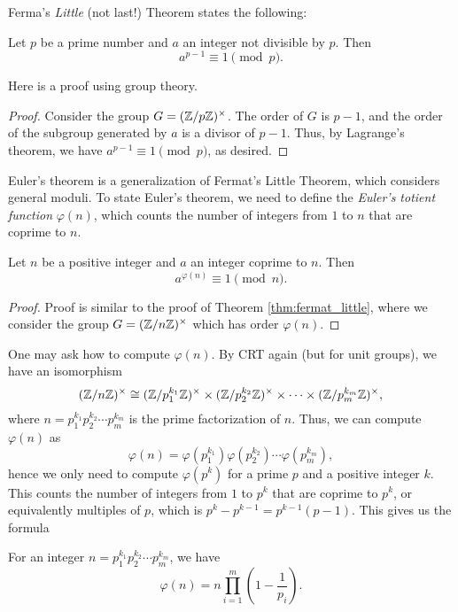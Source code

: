 Ferma's \emph{Little} (not last!) Theorem states the following:
\begin{theorem}
    \label{thm:fermat_little}
    Let $p$ be a prime number and $a$ an integer not divisible by $p$.
    Then
    \[
        a^{p - 1} \equiv 1 \pmod{p}.
    \]
\end{theorem}

Here is a proof using group theory.

\begin{proof}
    Consider the group $G = (\mathbb{Z} / p\mathbb{Z})^\times$.
    The order of $G$ is $p - 1$, and the order of the subgroup generated by $a$ is a divisor of $p - 1$.
    Thus, by Lagrange's theorem, we have $a^{p - 1} \equiv 1 \pmod{p}$, as desired.
\end{proof}

Euler's theorem is a generalization of Fermat's Little Theorem, which considers general moduli.
To state Euler's theorem, we need to define the \emph{Euler's totient function} $\varphi(n)$, which counts the number of integers from $1$ to $n$ that are coprime to $n$.

\begin{theorem}
    \label{thm:euler}
    Let $n$ be a positive integer and $a$ an integer coprime to $n$.
    Then
    \[
        a^{\varphi(n)} \equiv 1 \pmod{n}.
    \]
\end{theorem}
\begin{proof}
    Proof is similar to the proof of Theorem \ref{thm:fermat_little}, where we consider the group $G = (\mathbb{Z} / n\mathbb{Z})^\times$ which has order $\varphi(n)$.
\end{proof}

One may ask how to compute $\varphi(n)$.
By CRT again (but for unit groups), we have an isomorphism
\[
    (\mathbb{Z} / n\mathbb{Z})^\times \cong (\mathbb{Z} / p_1^{k_1}\mathbb{Z})^\times \times (\mathbb{Z} / p_2^{k_2}\mathbb{Z})^\times \times \cdots \times (\mathbb{Z} / p_m^{k_m}\mathbb{Z})^\times,
\]
where $n = p_1^{k_1} p_2^{k_2} \cdots p_m^{k_m}$ is the prime factorization of $n$.
Thus, we can compute $\varphi(n)$ as
\[
    \varphi(n) = \varphi(p_1^{k_1}) \varphi(p_2^{k_2}) \cdots \varphi(p_m^{k_m}),
\]
hence we only need to compute $\varphi(p^k)$ for a prime $p$ and a positive integer $k$.
This counts the number of integers from $1$ to $p^k$ that are coprime to $p^k$, or equivalently multiples of $p$, which is $p^k - p^{k - 1} = p^{k - 1}(p - 1)$.
This gives us the formula
\begin{theorem}
    \label{thm:phi_prime_power}
    For an integer $n = p_1^{k_1} p_2^{k_2} \cdots p_m^{k_m}$, we have
    \begin{equation}
    \label{eqn:phi_formula}
    \varphi(n) = n \prod_{i=1}^m \left(1 - \frac{1}{p_i}\right).
    \end{equation}
\end{theorem}

